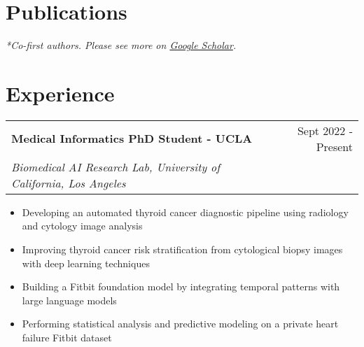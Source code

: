 \documentclass[a4paper,12pt]{article}
\makeatletter
\newenvironment{joblong}[3]
    {
    \begin{tabularx}{\linewidth}{@{}l X r@{}}
    \textbf{#1} & \hfill &  #2 \\
    \textit{#3} & & \\[3.75pt]  
    \end{tabularx}
    \begin{minipage}[t]{\linewidth}
    \begin{itemize}[nosep,after=\strut, leftmargin=1em, itemsep=3pt,label=\scriptsize$\bullet$]
    }
    {
    \end{itemize}
    \end{minipage}    
    }
\makeatother
\begin{document}
\section{Publications}
\begin{refsection}
\nocite{*}
\printbibliography[heading=none]
\end{refsection}
\textit{*Co-first authors. Please see more on \href{https://scholar.google.com/citations?user=xUyQJkcAAAAJ&hl=en}{Google Scholar}.}



\section{Experience}

\begin{joblong}{Medical Informatics PhD Student - UCLA}{Sept 2022 - Present}{Biomedical AI Research Lab, University of California, Los Angeles}
\item Developing an automated thyroid cancer diagnostic pipeline  using radiology and cytology image analysis
\item Improving thyroid cancer risk stratification from cytological biopsy images with deep learning techniques
\item Building a Fitbit foundation model by integrating temporal patterns with large language models
\item Performing statistical analysis and predictive modeling on a private heart failure Fitbit dataset
\end{joblong}
\end{document}
